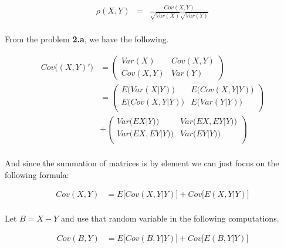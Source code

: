 \documentclass[12pt]{article}
\begin{document}
\begin{equation*}
	\begin{aligned}
	\rho(X,Y) &=& \frac{Cov(X, Y)}{\sqrt{Var(X)}\sqrt{Var(Y)}} \\
	\end{aligned}
\end{equation*}

From the problem \textbf{2.a}, we have the following.

\begin{equation*}
	\begin{aligned}
		Cov\big((X,Y)'\big) &=
		 \left(
		\begin{array}{cc}
			Var(X) & Cov(X,Y)\\
			Cov(X,Y) & Var(Y)
		\end{array}
		\right) \\
		&= \left(
		\begin{array}{cc}
			E\big(Var(X|Y)\big) & E\big(Cov(X,Y|Y)\big) \\
			E\big(Cov(X,Y|Y)\big) & E\big(Var(Y|Y)\big) \\
		\end{array}
		\right) \\
		&+ \left(
		\begin{array}{cc}
			Var\big(EX|Y)\big) & Var\big(EX,EY|Y)\big) \\
			Var\big(EX,EY|Y)\big) & Var\big(EY|Y)\big) \\
		\end{array}
		\right) \\
	\end{aligned}
\end{equation*}

And since the summation of matrices is by element we can just focus on the following formula:

\begin{equation*}
	\begin{aligned}
	Cov(X,Y) &= E\big[Cov(X,Y|Y)\big] + Cov\big[E(X,Y|Y)\big]\\
	\end{aligned}
\end{equation*}

Let $B=X-Y$ and use that random variable in the following computations.

\begin{equation*}
	\begin{aligned}
	Cov(B,Y) &= E\big[Cov(B,Y|Y)\big] + Cov\big[E(B,Y|Y)\big]\\
	\end{aligned}
\end{equation*}
\end{document}
